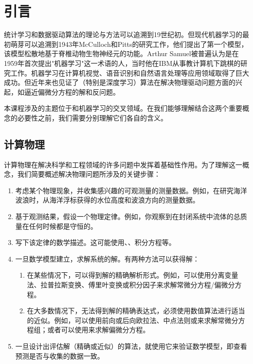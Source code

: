 \chapter{引言}
\label{chap:introduction}

统计学习和数据驱动算法的理论与方法可以追溯到19世纪初。但现代机器学习的最初萌芽可以追溯到1943年McCulloch和Pitts的研究工作\cite{mcculloch1943}，他们提出了第一个模型，该模型松散地基于脊椎动物生物神经元的功能。Arthur Samuel被普遍认为是在1959年首次提出"机器学习"这一术语的人，当时他在IBM从事教计算机下跳棋的研究工作\cite{samuel1959}。机器学习在计算机视觉、语音识别和自然语言处理等应用领域取得了巨大成功。但近年来也见证了（特别是深度学习）算法在解决物理驱动问题方面的兴起，如逼近偏微分方程的解和反问题。

本课程涉及的主题位于和机器学习的交叉领域。在我们能够理解结合这两个重要概念的必要性之前，我们需要分别理解它们各自的含义。

\section{计算物理}
\label{sec:computational_physics}

计算物理在解决科学和工程领域的许多问题中发挥着基础性作用。为了理解这一概念，我们简要概述解决物理问题所涉及的关键步骤：

\begin{enumerate}
\item 考虑某个物理现象，并收集感兴趣的可观测量的测量数据。例如，在研究海洋波浪时，从海洋浮标获得的水位高度和波浪方向的测量数据。

\item 基于观测结果，假设一个物理定律。例如，你观察到在封闭系统中流体的总质量在任何时候都是守恒的。

\item 写下该定律的数学描述。这可能使用、、积分方程等。

\item 一旦数学模型建立，求解系统的解。有两种方法可以获得解：
    \begin{enumerate}[label=(\alph*)]
    \item 在某些情况下，可以得到解的精确解析形式。例如，可以使用分离变量法、拉普拉斯变换、傅里叶变换或积分因子来求解常微分方程/偏微分方程。
    
    \item 在大多数情况下，无法得到解的精确表达式，必须使用数值算法进行适当的近似。例如，可以使用前向或后向欧拉法、中点法则或来求解常微分方程组\cite{burden2015}；或者可以使用来求解偏微分方程\cite{strikwerda2004}。
    \end{enumerate}

\item 一旦设计出评估解（精确或近似）的算法，就使用它来验证数学模型，即查看预测是否与收集的数据一致。
\end{enumerate}

